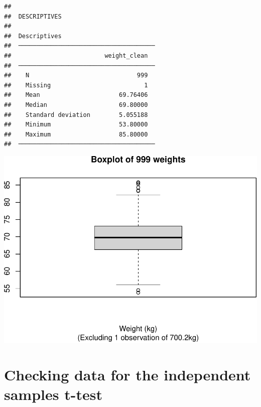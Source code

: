 \documentclass[
]{memoir}
\newenvironment{Shaded}{\begin{snugshade}}{\end{snugshade}}
\newcommand{\AttributeTok}[1]{\textcolor[rgb]{0.77,0.63,0.00}{#1}}
\newcommand{\FunctionTok}[1]{\textcolor[rgb]{0.00,0.00,0.00}{#1}}
\newcommand{\NormalTok}[1]{#1}
\newcommand{\SpecialCharTok}[1]{\textcolor[rgb]{0.00,0.00,0.00}{#1}}
\newcommand{\StringTok}[1]{\textcolor[rgb]{0.31,0.60,0.02}{#1}}
\begin{document}
\begin{verbatim}
## 
##  DESCRIPTIVES
## 
##  Descriptives                           
##  ────────────────────────────────────── 
##                          weight_clean   
##  ────────────────────────────────────── 
##    N                              999   
##    Missing                          1   
##    Mean                      69.76406   
##    Median                    69.80000   
##    Standard deviation        5.055188   
##    Minimum                   53.80000   
##    Maximum                   85.80000   
##  ──────────────────────────────────────
\end{verbatim}

\begin{Shaded}
\end{Shaded}

\includegraphics{phcm9795-R-notes_files/figure-latex/unnamed-chunk-87-1.pdf}

\hypertarget{checking-data-for-the-independent-samples-t-test}{%
\section{Checking data for the independent samples t-test}\label{checking-data-for-the-independent-samples-t-test}}
\end{document}
